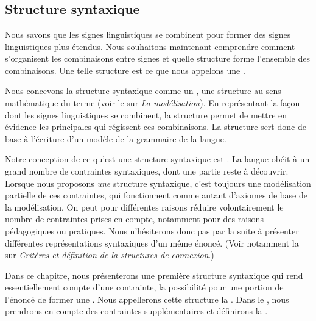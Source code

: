 \chapter{}\label{sec:3.2}

\section{Structure syntaxique}\label{sec:3.2.0}

Nous savons que les signes linguistiques se combinent pour former des signes linguistiques plus étendus. Nous souhaitons maintenant comprendre comment s’organisent les combinaisons entre signes et quelle structure forme l’ensemble des combinaisons. Une telle structure est ce que nous appelons une .

Nous concevons la structure syntaxique comme un , une structure au sens mathématique du terme (voir le  sur \textit{La modélisation}). En représentant la façon dont les signes linguistiques se combinent, la structure permet de mettre en évidence les principales  qui régissent ces combinaisons. La structure sert donc de base à l’écriture d’un modèle de la grammaire de la langue.

Notre conception de ce qu’est une structure syntaxique est . La langue obéit à un grand nombre de contraintes syntaxiques, dont une partie reste à découvrir. Lorsque nous proposons \textit{une} structure syntaxique, c’est toujours une modélisation partielle de ces contraintes, qui fonctionnent comme autant d’axiomes de base de la modélisation. On peut pour différentes raisons réduire volontairement le nombre de contraintes prises en compte, notamment pour des raisons pédagogiques ou pratiques. Nous n’hésiterons donc pas par la suite à présenter différentes représentations syntaxiques d’un même énoncé. (Voir notamment la  sur \textit{Critères et définition de la structures de connexion}.)

Dans ce chapitre, nous présenterons une première structure syntaxique qui rend essentiellement compte d’une contrainte, la possibilité pour une portion de l’énoncé de former une . Nous appellerons cette structure la . Dans le , nous prendrons en compte des contraintes supplémentaires et définirons la .

